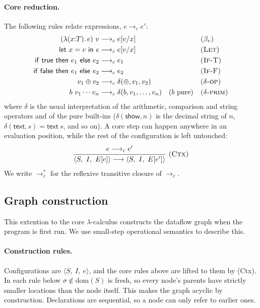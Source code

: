 \documentclass{article}
\makeatletter
\newcommand{\kw}[1]{\mathsf{#1}}
\newcommand{\cfg}[3]{\langle #1,\ #2,\ #3\rangle}
\newcommand{\step}{\longrightarrow}
\newcommand{\cstep}{\mathrel{\longrightarrow_{c}}}
\newcommand{\cstar}{\mathrel{\longrightarrow_{c}^{*}}}
\newcommand{\rul}[3]{\[\dfrac{\begin{array}{@{}c@{}}#2\end{array}}{\begin{array}{@{}c@{}}#3\end{array}}\ \textsc{#1}\]}
\makeatother
\begin{document}
\paragraph{Core reduction.} The following rules relate expressions, $e \cstep e'$:
\begin{align*}
(\lambda(x{:}T).\,e)\ v &\cstep e[v/x] & &\textsc{($\beta_v$)}\\
\kw{let}\ x = v\ \kw{in}\ e &\cstep e[v/x] & &\textsc{(Let)}\\
\kw{if}\ \kw{true}\ \kw{then}\ e_1\ \kw{else}\ e_2 &\cstep e_1 & &\textsc{(If-T)}\\
\kw{if}\ \kw{false}\ \kw{then}\ e_1\ \kw{else}\ e_2 &\cstep e_2 & &\textsc{(If-F)}\\
v_1 \oplus v_2 &\cstep \delta(\oplus, v_1, v_2) & &\textsc{($\delta$-op)}\\
b\ v_1\cdots v_n &\cstep \delta(b, v_1,\dots,v_n) \quad (b \text{ pure}) & &\textsc{($\delta$-prim)}
\end{align*}
where $\delta$ is the usual interpretation of the arithmetic, comparison and string operators and of the pure built-ins ($\delta(\kw{show},n)$ is the decimal string of $n$, $\delta(\kw{text},s) = \kw{text}\ s$, and so on). A core step can happen anywhere in an evaluation position, while the rest of the configuration is left untouched:
\rul{(Ctx)}{e \cstep e'}{\cfg{S}{I}{E[e]} \step \cfg{S}{I}{E[e']}}
We write $\cstar$ for the reflexive transitive closure of $\cstep$.

\subsection{Graph construction}

This extention to the core $ \lambda $-calculus constructs the dataflow graph when the program is first run. We use small-step operational semantics to describe this.

\paragraph{Construction rules.}
Configurations are $\cfg{S}{I}{e}$, and the core rules above are lifted to them by (Ctx). In each rule below $\sigma \notin \mathrm{dom}(S)$ is fresh, so every node's parents have strictly smaller locations than the node itself. This makes the graph acyclic by construction. Declarations are sequential, so a node can only refer to earlier ones.
\end{document}
